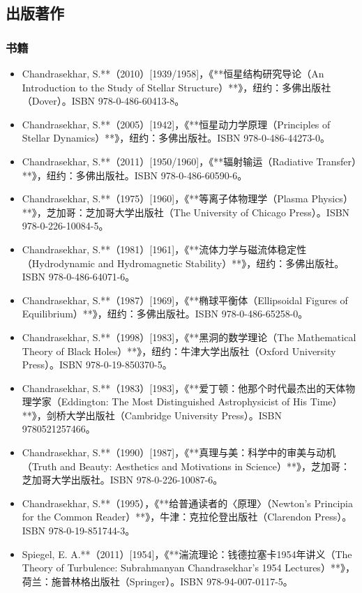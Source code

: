 \subsection{出版著作}
\subsubsection{书籍}
\begin{itemize}
\item Chandrasekhar, S.**（2010）[1939/1958]，《**恒星结构研究导论（An Introduction to the Study of Stellar Structure）**》，纽约：多佛出版社（Dover）。ISBN 978-0-486-60413-8。
\item Chandrasekhar, S.**（2005）[1942]，《**恒星动力学原理（Principles of Stellar Dynamics）**》，纽约：多佛出版社。ISBN 978-0-486-44273-0。
\item Chandrasekhar, S.**（2011）[1950/1960]，《**辐射输运（Radiative Transfer）**》，纽约：多佛出版社。ISBN 978-0-486-60590-6。
\item Chandrasekhar, S.**（1975）[1960]，《**等离子体物理学（Plasma Physics）**》，芝加哥：芝加哥大学出版社（The University of Chicago Press）。ISBN 978-0-226-10084-5。
\item Chandrasekhar, S.**（1981）[1961]，《**流体力学与磁流体稳定性（Hydrodynamic and Hydromagnetic Stability）**》，纽约：多佛出版社。ISBN 978-0-486-64071-6。
\item Chandrasekhar, S.**（1987）[1969]，《**椭球平衡体（Ellipsoidal Figures of Equilibrium）**》，纽约：多佛出版社。ISBN 978-0-486-65258-0。
\item Chandrasekhar, S.**（1998）[1983]，《**黑洞的数学理论（The Mathematical Theory of Black Holes）**》，纽约：牛津大学出版社（Oxford University Press）。ISBN 978-0-19-850370-5。
\item Chandrasekhar, S.**（1983）[1983]，《**爱丁顿：他那个时代最杰出的天体物理学家（Eddington: The Most Distinguished Astrophysicist of His Time）**》，剑桥大学出版社（Cambridge University Press）。ISBN 9780521257466。
\item Chandrasekhar, S.**（1990）[1987]，《**真理与美：科学中的审美与动机（Truth and Beauty: Aesthetics and Motivations in Science）**》，芝加哥：芝加哥大学出版社。ISBN 978-0-226-10087-6。
\item Chandrasekhar, S.**（1995），《**给普通读者的〈原理〉（Newton's Principia for the Common Reader）**》，牛津：克拉伦登出版社（Clarendon Press）。ISBN 978-0-19-851744-3。
\item Spiegel, E. A.**（2011）[1954]，《**湍流理论：钱德拉塞卡1954年讲义（The Theory of Turbulence: Subrahmanyan Chandrasekhar’s 1954 Lectures）**》，荷兰：施普林格出版社（Springer）。ISBN 978-94-007-0117-5。
\end{itemize}

